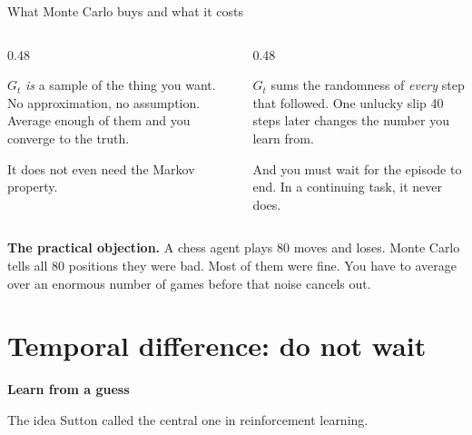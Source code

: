 \documentclass[aspectratio=169]{beamer}
\begin{document}
\begin{frame}{What Monte Carlo buys and what it costs}
  \begin{columns}[T]
    \begin{column}{0.48\textwidth}
      \begin{tcolorbox}[colback=paramgreen!8, colframe=paramgreen, boxrule=0.6pt, arc=2pt,
                        title={\textbf{Unbiased}}]
        \small
        $G_t$ \emph{is} a sample of the thing you want. No approximation, no assumption. Average
        enough of them and you converge to the truth.

        \vskip 4pt
        It does not even need the Markov property.
      \end{tcolorbox}
    \end{column}
    \begin{column}{0.48\textwidth}
      \begin{tcolorbox}[colback=armred!8, colframe=armred, boxrule=0.6pt, arc=2pt,
                        title={\textbf{High variance, and slow}}]
        \small
        $G_t$ sums the randomness of \emph{every} step that followed. One unlucky slip 40 steps
        later changes the number you learn from.

        \vskip 4pt
        And you must wait for the episode to end. In a continuing task, it never does.
      \end{tcolorbox}
    \end{column}
  \end{columns}

  \vskip 10pt
  \begin{tcolorbox}[colback=armorange!12, colframe=armorange, boxrule=0.6pt, arc=2pt]
    \small
    \textbf{The practical objection.} A chess agent plays 80 moves and loses. Monte Carlo tells
    all 80 positions they were bad. Most of them were fine. You have to average over an enormous
    number of games before that noise cancels out.
  \end{tcolorbox}
\end{frame}

\section{Temporal difference: do not wait}
\begin{frame}[plain]
  \begin{center}
    \vskip 1.6cm
    {\Huge\bfseries\color{popblue}Learn from a guess}

    \vskip 0.6cm
    {\large The idea Sutton called the central one in reinforcement learning.}
  \end{center}
\end{frame}
\end{document}

